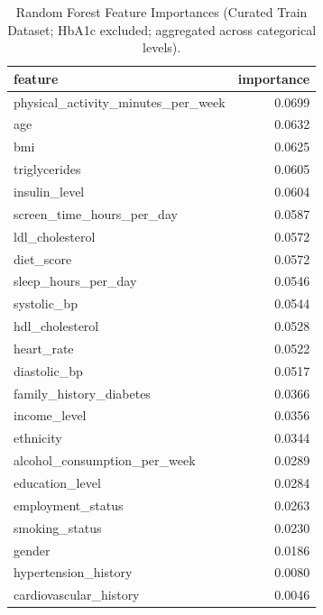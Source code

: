 \begin{table}[H]
\begin{center}
\begin{tabular}{lr}
\toprule
feature & importance \\
\midrule
physical\_activity\_minutes\_per\_week & 0.0699 \\
age & 0.0632 \\
bmi & 0.0625 \\
triglycerides & 0.0605 \\
insulin\_level & 0.0604 \\
screen\_time\_hours\_per\_day & 0.0587 \\
ldl\_cholesterol & 0.0572 \\
diet\_score & 0.0572 \\
sleep\_hours\_per\_day & 0.0546 \\
systolic\_bp & 0.0544 \\
hdl\_cholesterol & 0.0528 \\
heart\_rate & 0.0522 \\
diastolic\_bp & 0.0517 \\
family\_history\_diabetes & 0.0366 \\
income\_level & 0.0356 \\
ethnicity & 0.0344 \\
alcohol\_consumption\_per\_week & 0.0289 \\
education\_level & 0.0284 \\
employment\_status & 0.0263 \\
smoking\_status & 0.0230 \\
gender & 0.0186 \\
hypertension\_history & 0.0080 \\
cardiovascular\_history & 0.0046 \\
\bottomrule
\end{tabular}
\end{center}
\vspace{-5pt}
\caption{Random Forest Feature Importances (Curated Train Dataset; HbA1c excluded; aggregated across categorical levels).}
\label{tab:rf_importance_agg_no_hba1c}
\end{table}

